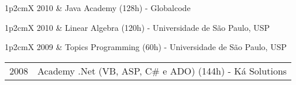 \documentclass[a4paper, oneside, final]{scrartcl}
\newcommand{\vspcitem}{\vspace{0.1cm}} %
\begin{document}
\begin{center}
\begin{tabularx}{1\linewidth}{p{2cm}X}
2010       & Java Academy (128h) - Globalcode \vspcitem\\
\end{tabularx}

\begin{tabularx}{1\linewidth}{p{2cm}X}
2010       & Linear Algebra (120h) - Universidade de São Paulo, USP \vspcitem\\
\end{tabularx}

\begin{tabularx}{1\linewidth}{p{2cm}X}
2009       & Topics Programming (60h) - Universidade de São Paulo, USP \vspcitem\\
\end{tabularx}

\begin{tabularx}{1\linewidth}{p{2cm}X}
2008       & Academy .Net (VB, ASP, C\# e ADO) (144h) - Ká Solutions 
\end{tabularx}


\end{center}
\end{document}

